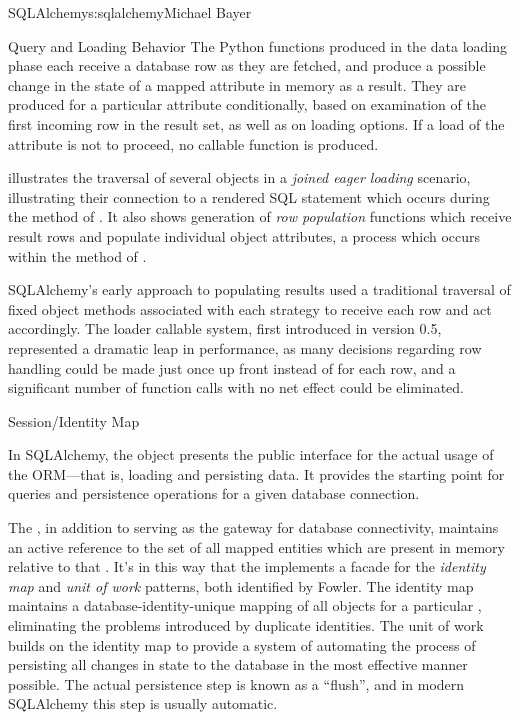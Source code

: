 \begin{aosachapter}{SQLAlchemy}{s:sqlalchemy}{Michael Bayer}
\begin{aosasect1}{Query and Loading Behavior}
The Python functions produced in the data loading phase each receive a database row
as they are fetched, and produce a possible change in the state of
a mapped attribute in memory as a result.   They are produced for a particular attribute
conditionally, based on examination of the first incoming row in the result set, as well as
on loading options.   If a load of the attribute is not to proceed, no callable function is produced.

 illustrates the traversal of several  objects in a \emph{joined eager loading}
scenario, illustrating their connection to a rendered SQL statement which occurs during the 
method of .  It also shows generation of \emph{row population} functions which receive result rows
and populate individual object attributes, a process which occurs within the  method of .


SQLAlchemy's early approach to populating results used a traditional traversal
of fixed object methods associated with each strategy to receive each row and
act accordingly. The loader callable system, first introduced in version 0.5,
represented a dramatic leap in performance, as many decisions regarding row
handling could be made just once up front instead of for each row, and a
significant number of function calls with no net effect could be eliminated.

\end{aosasect1}

\begin{aosasect1}{Session/Identity Map}

In SQLAlchemy,
the  object presents the public interface for the actual usage of
the ORM---that is, loading and persisting data.  It provides the starting
point for queries and persistence operations for a given database connection.

The , in addition to serving as the gateway for database connectivity,
maintains an active reference to the set of all mapped entities which are present
in memory relative to that .  It's in this way that the 
implements a facade for the \emph{identity map} and \emph{unit of work} patterns, both
identified by Fowler.   The identity map maintains a database-identity-unique
mapping of all objects for a particular , eliminating the problems
introduced by duplicate identities.  The unit of work builds on the identity map
to provide a system of automating the process of persisting all changes in state to the
database in the most effective manner possible.   The actual persistence step
is known as a ``flush'', and in modern SQLAlchemy this step is usually automatic.


\end{aosasect1}
\end{aosachapter}
